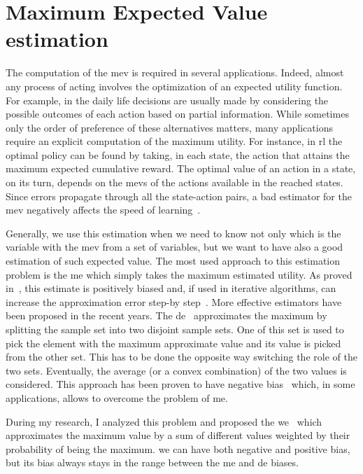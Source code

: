 \chapter{Maximum Expected Value estimation}
\newcommand{\est}[1]{\hat\mu_*^{#1}}
\newcommand{\transpose}[1]{{#1}^\texttt{T}}

The computation of the \gls{mev} is required in several applications. Indeed, almost any process of acting involves the optimization of an expected utility function. For example, in the daily life decisions are usually made by considering the possible outcomes of each action based on partial information.
While sometimes only the order of preference of these alternatives matters, many applications require an explicit computation of the maximum utility.
For instance, in \gls{rl} the optimal policy can be found by taking, in each state, the action that attains the maximum expected cumulative reward. The optimal value of an action in a state, on its turn, depends on the \glspl{mev} of the actions available in the reached states.
Since errors propagate through all the state-action pairs, a bad estimator for the \gls{mev} negatively affects the speed of learning~\cite{van2010double}.

Generally, we use this estimation when we need to know not only which is the variable with the \gls{mev} from a set of variables, but we want to have also a good estimation of such expected value. The most used approach to this estimation problem is the \gls{me} which simply takes the maximum estimated utility. As proved in~\cite{smith2006optimizer}, this estimate is positively biased and, if used in iterative algorithms, can increase the approximation error step-by step~\cite{van2010double}. More effective estimators have been proposed in the recent years. The \gls{de}~\cite{van2013estimating} approximates the maximum by splitting the sample set into two disjoint sample sets. One of this set is used to pick the element with the maximum approximate value and its value is picked from the other set. This has to be done the opposite way switching the role of the two sets. Eventually, the average (or a convex combination) of the two values is considered. This approach has been proven to have negative bias~\cite{van2013estimating} which, in some applications, allows to overcome the problem of \gls{me}.

During my research, I analyzed this problem and proposed the \gls{we}~\cite{deramo2016estimating} which approximates the maximum value by a sum of different values weighted by their probability of being the maximum. \gls{we} can have both negative and positive bias, but its bias always stays in the range between the \gls{me} and \gls{de} biases.

